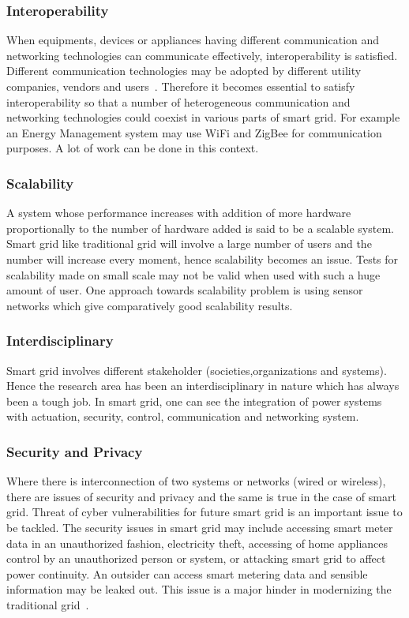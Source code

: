 \documentclass[journal]{IEEEtran}
\begin{document}
\subsubsection{Interoperability}
When equipments, devices or appliances having different communication and networking technologies can communicate effectively, interoperability is satisfied. Different communication technologies may be adopted by different utility companies, vendors and users~\cite{kailas2012survey}. Therefore it becomes essential to satisfy interoperability so that a number of heterogeneous communication and networking technologies could coexist in various parts of smart grid. For example an Energy Management system may use WiFi and ZigBee for communication purposes. A lot of work can be done in this context.\\
\subsubsection{Scalability}
A system whose performance increases with addition of more hardware proportionally to the number of hardware added is said to be a scalable system. Smart grid like traditional grid will involve a large number of users and the number will increase every moment, hence scalability becomes an issue. Tests for scalability made on small scale may not be valid when used with such a huge amount of user. One approach towards scalability problem is using sensor networks which give comparatively good scalability results.\\
\subsubsection{Interdisciplinary}
Smart grid involves different stakeholder (societies,organizations and systems). Hence the research area has been an interdisciplinary in nature which has always been a tough job. In smart grid, one can see the integration of power systems with actuation, security, control, communication and networking system.\\
\subsubsection{Security and Privacy}
Where there is interconnection of two systems or networks (wired or wireless), there are issues of security and privacy and the same is true in the case of smart grid. Threat of cyber vulnerabilities for future smart grid is an important issue to be tackled. The security issues in smart grid may include accessing smart meter data in an unauthorized fashion, electricity theft, accessing of home appliances control by an unauthorized person or system, or attacking smart grid to affect power continuity. An outsider can access smart metering data and sensible information may be leaked out. This issue is a major hinder in modernizing the traditional grid~\cite{kailas2012survey}.
\end{document}
